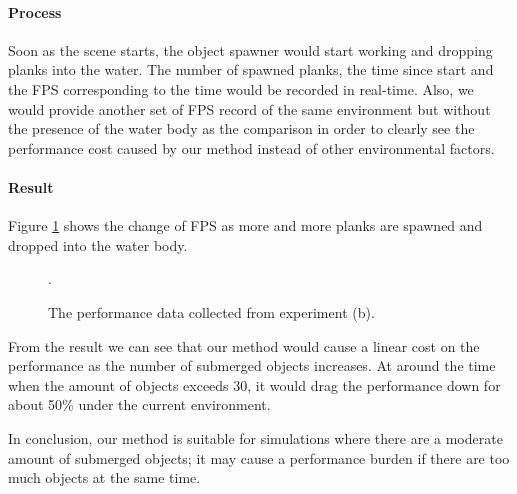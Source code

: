 \paragraph*{Process}

Soon as the scene starts, the object spawner would start working and dropping planks into the water.
The number of spawned planks, the time since start and the FPS corresponding to the time would be recorded in real-time.
Also, we would provide another set of FPS record of the same environment but without the presence of the water body as the comparison in order to clearly see the performance cost caused by our method instead of other environmental factors.

\paragraph*{Result}

Figure \ref{experiment-spawner} shows the change of FPS as more and more planks are spawned and dropped into the water body.

\begin{figure}[htb]
	\centering
	\caption{The performance data collected from experiment (b).}.
	\label{experiment-spawner}
\end{figure}

From the result we can see that our method would cause a linear cost on the performance as the number of submerged objects increases.
At around the time when the amount of objects exceeds 30, it would drag the performance down for about 50\% under the current environment.

In conclusion, our method is suitable for simulations where there are a moderate amount of submerged objects;
it may cause a performance burden if there are too much objects at the same time.